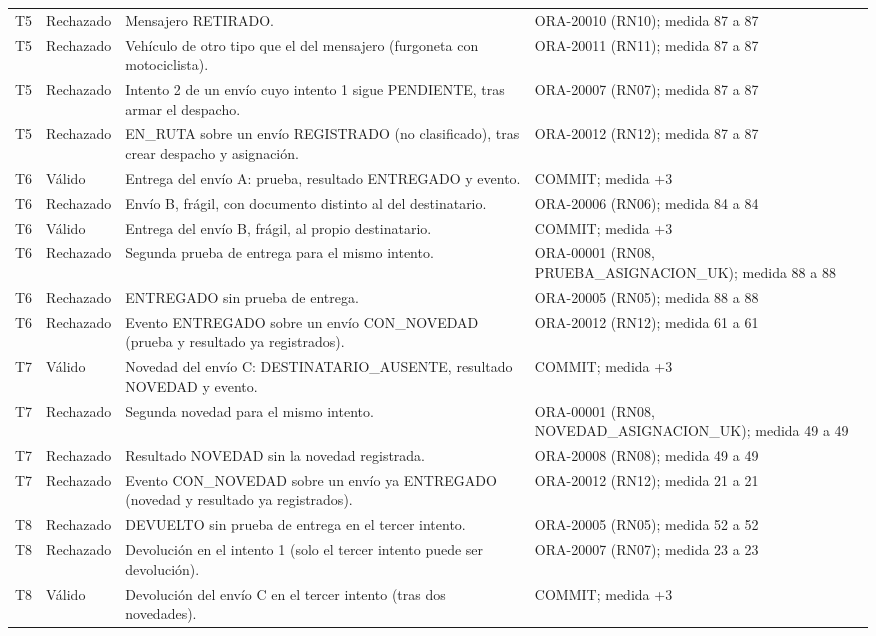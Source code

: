 {\begin{longtable}{L{0.9cm} L{1.5cm} L{7.0cm} L{4.4cm}}
T5 & Rechazado & Mensajero RETIRADO. & ORA-20010 (RN10); medida 87 a 87 \\
T5 & Rechazado & Vehículo de otro tipo que el del mensajero (furgoneta con motociclista). & ORA-20011 (RN11); medida 87 a 87 \\
T5 & Rechazado & Intento 2 de un envío cuyo intento 1 sigue PENDIENTE, tras armar el despacho. & ORA-20007 (RN07); medida 87 a 87 \\
T5 & Rechazado & EN\_RUTA sobre un envío REGISTRADO (no clasificado), tras crear despacho y asignación. & ORA-20012 (RN12); medida 87 a 87 \\
T6 & Válido & Entrega del envío A: prueba, resultado ENTREGADO y evento. & COMMIT; medida +3 \\
T6 & Rechazado & Envío B, frágil, con documento distinto al del destinatario. & ORA-20006 (RN06); medida 84 a 84 \\
T6 & Válido & Entrega del envío B, frágil, al propio destinatario. & COMMIT; medida +3 \\
T6 & Rechazado & Segunda prueba de entrega para el mismo intento. & ORA-00001 (RN08, PRUEBA\_ASIGNACION\_UK); medida 88 a 88 \\
T6 & Rechazado & ENTREGADO sin prueba de entrega. & ORA-20005 (RN05); medida 88 a 88 \\
T6 & Rechazado & Evento ENTREGADO sobre un envío CON\_NOVEDAD (prueba y resultado ya registrados). & ORA-20012 (RN12); medida 61 a 61 \\
T7 & Válido & Novedad del envío C: DESTINATARIO\_AUSENTE, resultado NOVEDAD y evento. & COMMIT; medida +3 \\
T7 & Rechazado & Segunda novedad para el mismo intento. & ORA-00001 (RN08, NOVEDAD\_ASIGNACION\_UK); medida 49 a 49 \\
T7 & Rechazado & Resultado NOVEDAD sin la novedad registrada. & ORA-20008 (RN08); medida 49 a 49 \\
T7 & Rechazado & Evento CON\_NOVEDAD sobre un envío ya ENTREGADO (novedad y resultado ya registrados). & ORA-20012 (RN12); medida 21 a 21 \\
T8 & Rechazado & DEVUELTO sin prueba de entrega en el tercer intento. & ORA-20005 (RN05); medida 52 a 52 \\
T8 & Rechazado & Devolución en el intento 1 (solo el tercer intento puede ser devolución). & ORA-20007 (RN07); medida 23 a 23 \\
T8 & Válido & Devolución del envío C en el tercer intento (tras dos novedades). & COMMIT; medida +3 \\

\end{longtable}}

